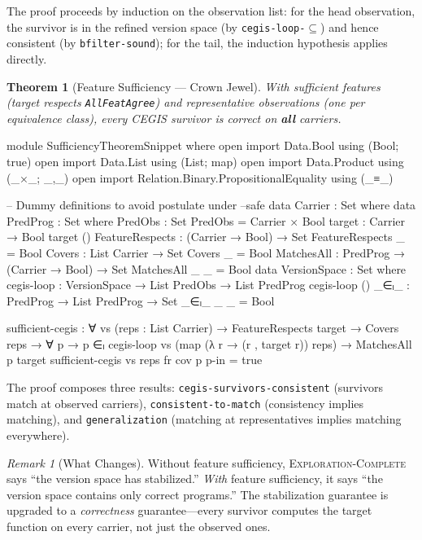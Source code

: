 \documentclass[9pt,a4paper]{article}
\theoremstyle{plain}
\newtheorem{theorem}{Theorem}
\theoremstyle{definition}
\theoremstyle{remark}
\newtheorem{remark}{Remark}
\begin{document}
\noindent The proof proceeds by induction on the observation list: for the head observation, the survivor is in the refined version space (by \texttt{cegis-loop-$\subseteq$}) and hence consistent (by \texttt{bfilter-sound}); for the tail, the induction hypothesis applies directly.

\begin{theorem}[Feature Sufficiency --- Crown Jewel]
\label{thm:sufficiency}
With sufficient features (target respects \texttt{AllFeatAgree}) and representative observations (one per equivalence class), every CEGIS survivor is correct on \textbf{all} carriers.
\end{theorem}

\begin{code}[hide]
module SufficiencyTheoremSnippet where
  open import Data.Bool using (Bool; true)
  open import Data.List using (List; map)
  open import Data.Product using (_×_; _,_)
  open import Relation.Binary.PropositionalEquality using (_≡_)

  -- Dummy definitions to avoid postulate under --safe
  data Carrier : Set where
  data PredProg : Set where
  PredObs : Set
  PredObs = Carrier × Bool
  target : Carrier → Bool
  target ()
  FeatureRespects : (Carrier → Bool) → Set
  FeatureRespects _ = Bool
  Covers : List Carrier → Set
  Covers _ = Bool
  MatchesAll : PredProg → (Carrier → Bool) → Set
  MatchesAll _ _ = Bool
  data VersionSpace : Set where
  cegis-loop : VersionSpace → List PredObs → List PredProg
  cegis-loop ()
  _∈ₗ_ : PredProg → List PredProg → Set
  _∈ₗ_ _ _ = Bool
\end{code}
\begin{code}
  sufficient-cegis : ∀ vs (reps : List Carrier) →
    FeatureRespects target →
    Covers reps →
    ∀ p → p ∈ₗ cegis-loop vs
                  (map (λ r → (r , target r)) reps) →
    MatchesAll p target
  sufficient-cegis vs reps fr cov p p-in = true
\end{code}

\noindent The proof composes three results: \texttt{cegis-survivors-consistent} (survivors match at observed carriers), \texttt{consistent-to-match} (consistency implies matching), and \texttt{generalization} (matching at representatives implies matching everywhere).

\begin{remark}[What Changes]
Without feature sufficiency, \textsc{Exploration-Complete} says ``the version space has stabilized.''  \emph{With} feature sufficiency, it says ``the version space contains only correct programs.''  The stabilization guarantee is upgraded to a \emph{correctness} guarantee---every survivor computes the target function on every carrier, not just the observed ones.
\end{remark}
\end{document}
